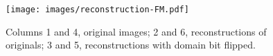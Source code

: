 \documentclass{article}
\newcommand\todo[1]{\textcolor{red}{#1}}
\newcommand{\remove}[1]{}
\begin{document}

 \begin{figure}[t]
\centering
\texttt{[image: images/reconstruction-FM.pdf]}
\caption{\remove{Reconstructions for the source and target test images. From left to right: the original image $x_{test}$, reconstructed image $F(G(x_{test}), d(d=0)$; reconstructed image  $F(G( x_{test}), d(d=1)$.}Columns 1 and 4, original images;  2 and 6, reconstructions of originals; 3 and 5, reconstructions with domain bit flipped.}%
\label{recon_fm} 
\vspace{-2mm}
\end{figure}

\end{document}
